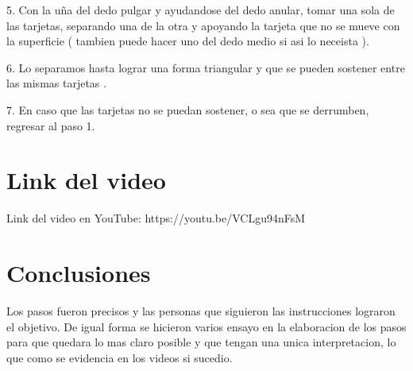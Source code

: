 \documentclass{article}
\begin{document}
5. Con la uña del dedo pulgar y ayudandose del dedo anular, tomar una sola de las tarjetas, separando una de la otra y apoyando la tarjeta que no se mueve con la superficie ( tambien puede hacer uno del dedo medio si asi lo neceista ).\newline \newline

6. Lo separamos hasta lograr una forma triangular y que se pueden sostener entre las mismas tarjetas . \newline \newline

7. En caso que las tarjetas no se puedan sostener, o sea que se derrumben, regresar al paso 1.
\newpage

\section{Link del video} \label{Link del video}

Link del video en YouTube: \newline https://youtu.be/VCLgu94nFsM
 \newpage
 
\section{Conclusiones} \label{Conclusiones}

Los pasos fueron precisos y las personas que siguieron las instrucciones lograron el objetivo.
De igual forma se hicieron varios ensayo en la elaboracion de los pasos para que quedara lo mas claro posible y que tengan una unica interpretacion, lo que como se evidencia en los videos si sucedio.
\end{document}
